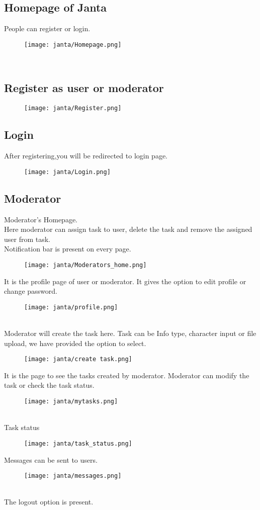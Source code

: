 \documentclass{article}
\begin{document}
\subsection{Homepage of Janta}
People can register or login.
\begin{figure}[htp]
    \texttt{[image: janta/Homepage.png]}
\end{figure}
\\
\subsection{Register as user or moderator}
\begin{figure}[htp]
    \texttt{[image: janta/Register.png]}
\end{figure}
\newpage
\subsection{Login}
After registering,you will be redirected to login page.
\begin{figure}[htp]
    \texttt{[image: janta/Login.png]}
\end{figure}
\newpage
\subsection{Moderator}
Moderator's Homepage.\\
Here moderator can assign task to user, delete the task and remove the assigned user from task.\\
Notification bar is present on every page.\\
\begin{figure}[htp]
    \texttt{[image: janta/Moderators\_home.png]}
\end{figure}
\newpage
It is the profile page of user or moderator. It gives the option to edit profile or change password.
\begin{figure}[htp]
    \texttt{[image: janta/profile.png]}
\end{figure}
\\
Moderator will create the task here. Task can be Info type, character input or file upload, we have provided the option to select.
\begin{figure}[htp]
    \texttt{[image: janta/create task.png]}
\end{figure}

\newpage
It is the page to see the tasks created by moderator. Moderator can modify the task or check the task status.
\begin{figure}[htp]
    \texttt{[image: janta/mytasks.png]}
\end{figure}
\\
Task status
\begin{figure}[htp]
    \texttt{[image: janta/task\_status.png]}
\end{figure}
\newpage
Messages can be sent to users.
\begin{figure}[htp]
    \texttt{[image: janta/messages.png]}
\end{figure}
\\
The logout option is present.
\end{document}
